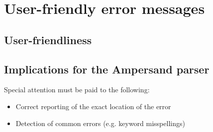 
\section{User-friendly error messages}
\label{sec:errors}

\subsection{User-friendliness}
\lipsum[1]

\subsection{Implications for the Ampersand parser}
Special attention must be paid to the following:
\begin{itemize}
	\item Correct reporting of the exact location of the error
	\item Detection of common errors (e.g. keyword misspellings)
\end{itemize}